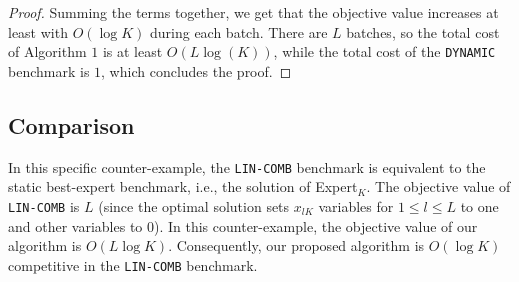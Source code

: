\begin{proof}
     Summing the terms together, we get that the objective value increases at least with $O(\log K)$ during each batch. There are $L$ batches, so the total cost of Algorithm $1$ is at least $O(L \log(K))$,
     while the total cost of the \texttt{DYNAMIC} benchmark is $1$, which concludes the proof.
\end{proof}

\subsection{Comparison}

In this specific counter-example, the \texttt{LIN-COMB} benchmark is equivalent to the static best-expert benchmark, i.e., the solution of Expert$_K$. The objective value of \texttt{LIN-COMB} is $L$ (since the optimal solution sets $x_{lK}$ variables for $1 \leq l \leq L$  to one and other variables to 0). In this counter-example, the objective value of our algorithm is $O(L\log K)$. Consequently, our proposed algorithm is $O(\log K)$ competitive in the \texttt{LIN-COMB} benchmark.
